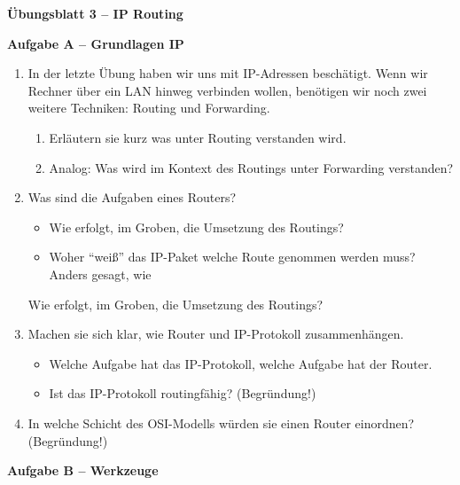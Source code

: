 \documentclass[paper=a4,fontsize=11pt]{scrartcl}%
\numberwithin{equation}{section}
\begin{document}
\begin{center}
\Large{\textbf{Übungsblatt 3 -- IP Routing}}
\end{center}

\begin{center}\Large{\textbf{Aufgabe A -- Grundlagen IP}}\end{center}\vskip0.25in
\begin{enumerate}
	\item In der letzte Übung haben wir uns mit IP-Adressen beschätigt. Wenn wir Rechner über ein LAN hinweg verbinden wollen, benötigen wir noch zwei weitere Techniken: Routing und Forwarding.
		\begin{enumerate}
			\item Erläutern sie kurz was unter Routing verstanden wird.
			\item Analog: Was wird im Kontext des Routings unter Forwarding verstanden?
		\end{enumerate}
		\item Was sind die Aufgaben eines Routers?
		\begin{itemize}
			\item Wie erfolgt, im Groben, die Umsetzung des Routings?
			\item Woher \enquote{weiß} das IP-Paket welche Route genommen werden muss? Anders gesagt, wie 
		\end{itemize}				
		Wie erfolgt, im Groben, die Umsetzung des Routings?
	\item Machen sie sich klar, wie Router und IP-Protokoll zusammenhängen.
	\begin{itemize}
		\item Welche Aufgabe hat das IP-Protokoll, welche Aufgabe hat der Router.
		\item Ist das IP-Protokoll routingfähig? (Begründung!) 
	\end{itemize}
	\item In welche Schicht des OSI-Modells würden sie einen Router einordnen? (Begründung!)
\end{enumerate}

\begin{center}\Large{\textbf{Aufgabe B -- Werkzeuge}}\end{center}\vskip0.25in
\end{document}
